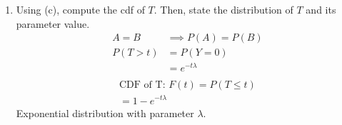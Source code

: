 \documentclass{article}
\begin{document}
\begin{enumerate}[label=\alph*)]
\begin{description}
          \end{description}
    \item Using (c), compute the cdf of \(T\). Then, state the distribution of \(T\) and its parameter value.
          \begin{align*}
              A = B    & \implies P(A) = P(B) \\
              P(T > t) & =  P(Y = 0)          \\
                       & = e^{-t\lambda}      \\
          \end{align*}
          \begin{align*}
              \text{CDF of T: } F(t) =  P(T \leq t) \\
              = 1 - e^{-t\lambda}
          \end{align*}
          Exponential distribution with parameter \(\lambda\).
\end{enumerate}
\end{document}
